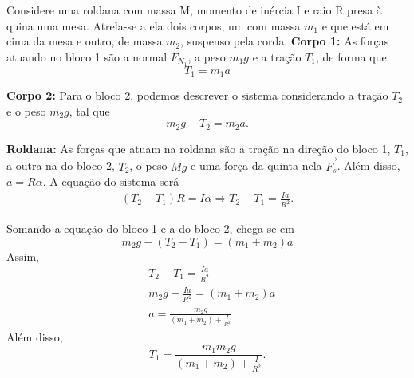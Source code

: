 \documentclass[PhysicsII/physicsII_notes.tex]{subfiles}
\begin{document}
\begin{example}
	Considere uma roldana com massa M, momento de inércia I e raio R presa à quina uma mesa. Atrela-se a ela dois corpos, um com massa \(m_{1}\) e que está em cima da mesa
	e outro, de massa \(m_{2}\), suspenso pela corda.
	\textbf{Corpo 1:}
	As forças atuando no bloco 1 são a normal \(F_{N_{1}}\), a peso \(m_{1}g\) e a tração \(T_{1}\), de forma que
	\[
		T_{1}=m_{1}a
	\]

	\textbf{Corpo 2:}
	Para o bloco 2, podemos descrever o sistema considerando a tração \(T_{2}\) e o peso \(m_{2}g\), tal que
	\[
		m_{2}g - T_{2} = m_{2}a.
	\]

	\textbf{Roldana:}
	As forças que atuam na roldana são a tração na direção do bloco 1, \(T_{1}\), a outra na do bloco 2, \(T_{2}\), o peso
	\(Mg\) e uma força da quinta nela \(\vec{F_{s}}\). Além disso, \(a=R\alpha \). A equação do sistema será
	\begin{align*}
		(T_{2}-T_{1})R = I\alpha \Rightarrow  T_{2} - T_{1} = \frac{Ia}{R^{2}}.
	\end{align*}

	Somando a equação do bloco 1 e a do bloco 2, chega-se em
	\[
		m_{2}g - (T_{2}-T_{1}) = (m_{1}+m_{2})a
	\]
	Assim,
	\begin{align*}
		 & T_{2} - T_{1} = \frac{Ia}{R^{2}}                 \\
		 & m_{2}g - \frac{Ia}{R^{2}} = (m_{1}+m_{2})a       \\
		 & a = \frac{m_{2}g}{(m_{1}+m_2) + \frac{I}{R^{2}}}
	\end{align*}
	Além disso,
	\[
		T_{1} = \frac{m_{1}m_{2}g}{(m_{1}+m_{2})+\frac{I}{R^{2}}}.
	\]
\end{example}
\end{document}
